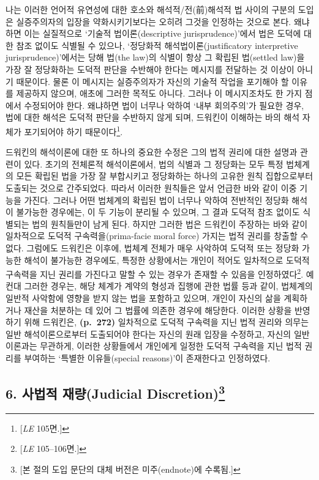 나는 이러한 언어적 유연성에 대한 호소와 해석적/전(前)해석적 법 사이의
구분의 도입은 실증주의자의 입장을 약화시키기보다는 오히려 그것을
인정하는 것으로 본다. 왜냐하면 이는 실질적으로 `기술적
법이론(descriptive jurisprudence)'에서 법은 도덕에 대한 참조 없이도
식별될 수 있으나, `정당화적 해석법이론(justificatory interpretive
jurisprudence)'에서는 당해 법(the law)의 식별이 항상 그 확립된
법(settled law)을 가장 잘 정당화하는 도덕적 판단을 수반해야 한다는
메시지를 전달하는 것 이상이 아니기 때문이다. 물론 이 메시지는
실증주의자가 자신의 기술적 작업을 포기해야 할 이유를 제공하지 않으며,
애초에 그러한 목적도 아니다. 그러나 이 메시지조차도 한 가지 점에서
수정되어야 한다. 왜냐하면 법이 너무나 악하여 `내부 회의주의'가 필요한
경우, 법에 대한 해석은 도덕적 판단을 수반하지 않게 되며, 드워킨이
이해하는 바의 해석 자체가 포기되어야 하기 때문이다\footnote{{[}\emph{LE}
  105면.{]}}.

드워킨의 해석이론에 대한 또 하나의 중요한 수정은 그의 법적 권리에 대한
설명과 관련이 있다. 초기의 전체론적 해석이론에서, 법의 식별과 그
정당화는 모두 특정 법체계의 모든 확립된 법을 가장 잘 부합시키고
정당화하는 하나의 고유한 원칙 집합으로부터 도출되는 것으로 간주되었다.
따라서 이러한 원칙들은 앞서 언급한 바와 같이 이중 기능을 가진다. 그러나
어떤 법체계의 확립된 법이 너무나 악하여 전반적인 정당화 해석이 불가능한
경우에는, 이 두 기능이 분리될 수 있으며, 그 결과 도덕적 참조 없이도
식별되는 법의 원칙들만이 남게 된다. 하지만 그러한 법은 드워킨이 주장하는
바와 같이 일차적으로 도덕적 구속력을(prima-facie moral force) 가지는
법적 권리를 창출할 수 없다. 그럼에도 드워킨은 이후에, 법체계 전체가 매우
사악하여 도덕적 또는 정당화 가능한 해석이 불가능한 경우에도, 특정한
상황에서는 개인이 적어도 일차적으로 도덕적 구속력을 지닌 권리를 가진다고
말할 수 있는 경우가 존재할 수 있음을 인정하였다\footnote{{[}\emph{LE}
  105--106면.{]}}. 예컨대 그러한 경우는, 해당 체계가 계약의 형성과
집행에 관한 법률 등과 같이, 법체계의 일반적 사악함에 영향을 받지 않는
법을 포함하고 있으며, 개인이 자신의 삶을 계획하거나 재산을 처분하는 데
있어 그 법률에 의존한 경우에 해당한다. 이러한 상황을 반영하기 위해
드워킨은, \textbf{(p.~272)} 일차적으로 도덕적 구속력을 지닌 법적 권리와
의무는 일반 해석이론으로부터 도출되어야 한다는 자신의 원래 입장을
수정하고, 자신의 일반 이론과는 무관하게, 이러한 상황들에서 개인에게
일정한 도덕적 구속력을 지닌 법적 권리를 부여하는 `특별한 이유들(special
reasons)'이 존재한다고 인정하였다.

\subsection[6. 사법적 재량(Judicial Discretion)]{\texorpdfstring{6.
사법적 재량(Judicial
Discretion)\footnote{{[}본 절의 도입 문단의 대체 버전은 미주(endnote)에
  수록됨.{]}}}{6. 사법적 재량(Judicial Discretion)}}\label{uxc0acuxbc95uxc801-uxc7acuxb7c9judicial-discretion73}

